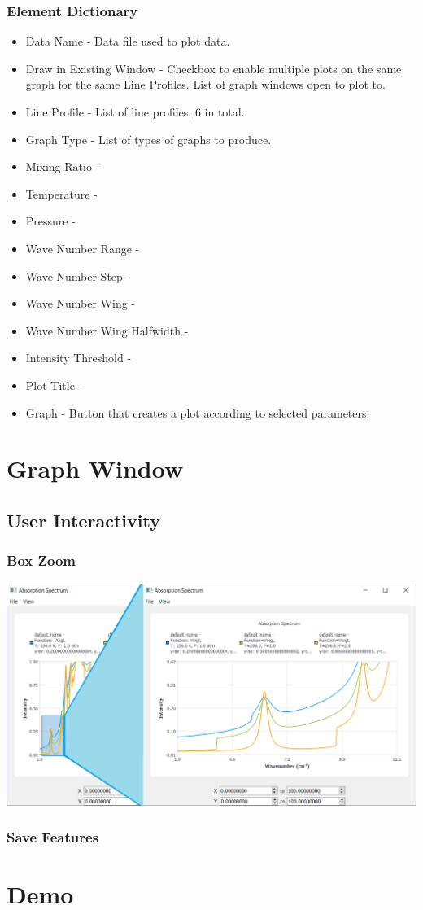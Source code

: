 \documentclass[12pt]{article}
\begin{document}
\subsubsection{Element Dictionary}
\begin{itemize}
\item Data Name - Data file used to plot data.
\item Draw in Existing Window - Checkbox to enable multiple plots on the same graph for the same Line Profiles. List of graph windows open to plot to.
\item Line Profile - List of line profiles, 6 in total.
\item Graph Type - List of types of graphs to produce.
\item Mixing Ratio -
\item Temperature -
\item Pressure -
\item Wave Number Range -
\item Wave Number Step -
\item Wave Number Wing -
\item Wave Number Wing Halfwidth -
\item Intensity Threshold -
\item Plot Title -
\item Graph - Button that creates a plot according to selected parameters.
\end{itemize}

\section{Graph Window}
\subsection{User Interactivity}
\subsubsection{Box Zoom}
\includegraphics[scale = 0.5]{GraphDemo}
\subsubsection{Save Features}

\section{Demo}
\end{document}
